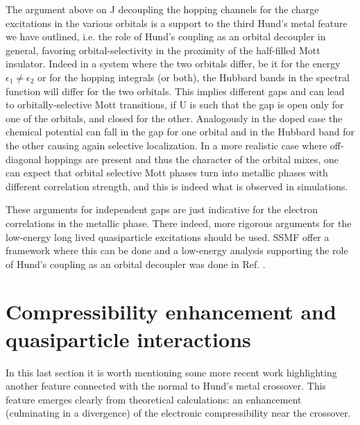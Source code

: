 \documentclass[12pt,twoside]{article}
\def\eps{\epsilon}
\begin{document}
The argument above on J decoupling the hopping channels for the charge excitations in the various orbitals is a support to the third Hund's metal feature we have outlined, i.e. the role of Hund's coupling as an orbital decoupler in general, favoring orbital-selectivity in the proximity of the half-filled Mott insulator.
Indeed in a system where the two orbitals differ, be it for the energy $\eps_1\neq\eps_2$ or for the hopping integrals (or both), the Hubbard bands in the spectral function will differ for the two orbitals\cite{Koga_OSMT}. This implies different gaps and can lead to orbitally-selective Mott transitions, if U is such that the gap is open only for one of the orbitals, and closed for the other. Analogously in the doped case the chemical potential can fall in the gap for one orbital and in the Hubbard band for the other causing again selective localization. In a more realistic case where off-diagonal hoppings are present and thus the character of the orbital mixes, one can expect that orbital selective Mott phases turn into metallic phases with different correlation strength, and this is indeed what is observed in simulations.

These arguments for independent gaps are just indicative for the electron correlations in the metallic phase. There indeed, more rigorous arguments for the low-energy long lived quasiparticle excitations should be used. SSMF offer a framework where this can be done and a low-energy analysis supporting the role of Hund's coupling as an orbital decoupler was done in Ref. \cite{demedici_Vietri}. 

\section{Compressibility enhancement and quasiparticle interactions}\label{sec:compress}

In this last section it is worth mentioning some more recent work highlighting another feature connected with the normal to Hund's metal crossover. This feature emerges clearly from theoretical calculations: an enhancement (culminating in a divergence) of the electronic compressibility near the crossover.
\end{document}
